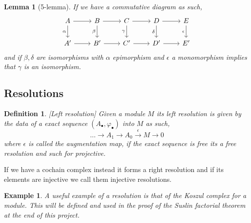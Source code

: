 \documentclass[12pt]{article}
\numberwithin{equation}{section}
\newcounter{dummy} \numberwithin{dummy}{section}
\newtheorem{definition}[dummy]{Definition}
\newtheorem{lemma}[dummy]{Lemma}
\newtheorem{example}[dummy]{Example}
\begin{document}
	\begin{lemma}[5-lemma]
		If we have a commutative diagram as such,
		\[\begin{tikzcd}
			A & B & C & D & E \\
			{A'} & {B'} & {C'} & {D'} & {E'}
			\arrow[from=1-1, to=1-2]
			\arrow["\alpha"', from=1-1, to=2-1]
			\arrow[from=1-2, to=1-3]
			\arrow["\beta"', from=1-2, to=2-2]
			\arrow[from=1-3, to=1-4]
			\arrow["\gamma"', from=1-3, to=2-3]
			\arrow[from=1-4, to=1-5]
			\arrow["\delta"', from=1-4, to=2-4]
			\arrow["\epsilon"', from=1-5, to=2-5]
			\arrow[from=2-1, to=2-2]
			\arrow[from=2-2, to=2-3]
			\arrow[from=2-3, to=2-4]
			\arrow[from=2-4, to=2-5]
		\end{tikzcd}\]
		and if $\beta, \delta $ are isomorphisms with $\alpha $ epimorphism and $\epsilon $ a monomorphism implies that $\gamma $ is an isomorphism.
	\end{lemma}
	
	\subsection{Resolutions}
	
	\begin{definition}\label{defresolution}[Left resolution]
		Given a module $M$ its {left resolution} is given by the data of a exact sequence $(A_\bullet, \varphi_\bullet)$ into $M$ as such,
		\[ 	\dots \to A_1	\to A_0 \xrightarrow{\epsilon} M \to 0 \]
		where $\epsilon $ is called the {augmentation map}, if the exact sequence is free its a free resolution and such for projective. 
	\end{definition}
	
	
	If we have a cochain complex instead it forms a {right resolution} and if its elements are injective we call them injective resolutions.
		\begin{example}
		A useful example of a resolution is that of the Koszul complex for a module. This will be defined and used in the proof of the Suslin factorial theorem at the end of this project.
	\end{example}
	
\end{document}
